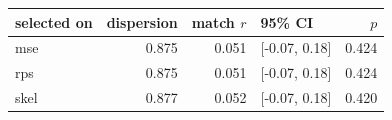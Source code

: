 
\begin{tabular}{lrrlr}
\toprule
selected on & dispersion & match $r$ & 95\% CI & $p$\\
\midrule
mse & 0.875 & 0.051 & {}[-0.07, 0.18] & 0.424\\
rps & 0.875 & 0.051 & {}[-0.07, 0.18] & 0.424\\
skel & 0.877 & 0.052 & {}[-0.07, 0.18] & 0.420\\
\bottomrule
\end{tabular}
